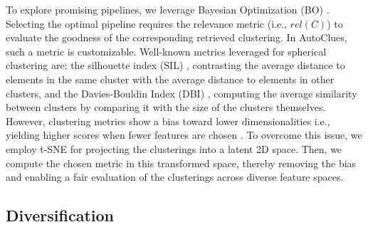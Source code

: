 To explore promising pipelines, we leverage Bayesian Optimization (BO) \cite{hutter2011sequential}.
Selecting the optimal pipeline requires the relevance metric (i.e., $rel(C)$) to evaluate the goodness of the corresponding retrieved clustering.
In AutoClues, such a metric is customizable.
Well-known metrics leveraged for spherical clustering are: the silhouette index (SIL) \cite{zhu2010clustering}, contrasting the average distance to elements in the same cluster with the average distance to elements in other clusters, and the Davies-Bouldin Index (DBI) \cite{dbi}, computing the average similarity between clusters by comparing it with the size of the clusters themselves.
%
However, clustering metrics show a bias toward lower dimensionalities i.e., yielding higher scores when fewer features are chosen \cite{lensen2017using,hancer2020new}.
To overcome this issue, we employ t-SNE \cite{van2008visualizing} for projecting the clusterings into a latent 2D space.
Then, we compute the chosen metric in this transformed space, thereby removing the bias and enabling a fair evaluation of the clusterings across diverse feature spaces.



\subsection{Diversification}
\label{clustering-ssec:diversification}

